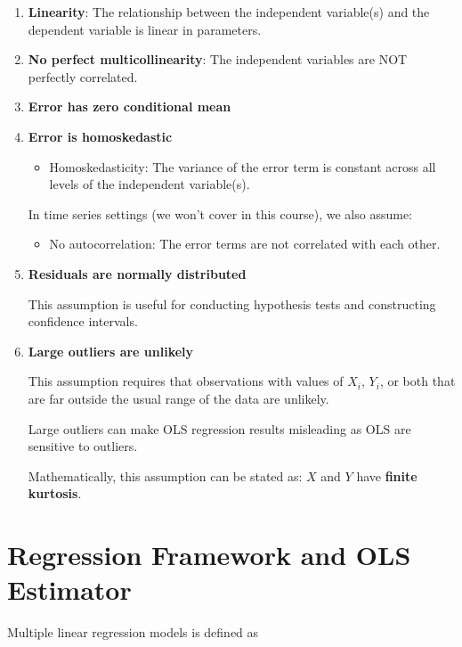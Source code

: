 \documentclass[
  12pt,
  letterpaper,
]{scrbook}
\providecommand{\tightlist}{%
  \setlength{\itemsep}{0pt}\setlength{\parskip}{0pt}}
\renewcommand{\tightlist}{\setlength{\itemsep}{0.5\baselineskip}\setlength{\parskip}{0.2\baselineskip}}
\theoremstyle{definition}
\theoremstyle{plain}
\theoremstyle{remark}
\begin{document}
\begin{enumerate}
\def\labelenumi{\arabic{enumi}.}
\item
  \textbf{Linearity}: The relationship between the independent
  variable(s) and the dependent variable is linear in parameters.
\item
  \textbf{No perfect multicollinearity}: The independent variables are
  NOT {perfectly correlated.}
\item
  \textbf{Error has zero conditional mean}
\item
  \textbf{Error is homoskedastic}

  \begin{itemize}
  \tightlist
  \item
    Homoskedasticity: The variance of the error term is constant across
    all levels of the independent variable(s).
  \end{itemize}

  {In time series settings (we won't cover in this course), we also
  assume:}

  \begin{itemize}
  \tightlist
  \item
    {No autocorrelation: The error terms are not correlated with each
    other.}
  \end{itemize}
\item
  \textbf{Residuals are normally distributed}

  This assumption is useful for conducting hypothesis tests and
  constructing confidence intervals.
\item
  \textbf{Large outliers are unlikely}

  This assumption requires that observations with values of \(X_i\),
  \(Y_i\), or both that are far outside the usual range of the data are
  unlikely.

  Large outliers can make OLS regression results misleading as OLS are
  sensitive to outliers.

  Mathematically, this assumption can be stated as: \(X\) and \(Y\) have
  \textbf{finite kurtosis}.
\end{enumerate}

\section{Regression Framework and OLS
Estimator}\label{regression-framework-and-ols-estimator}

Multiple linear regression models is defined as
\end{document}
